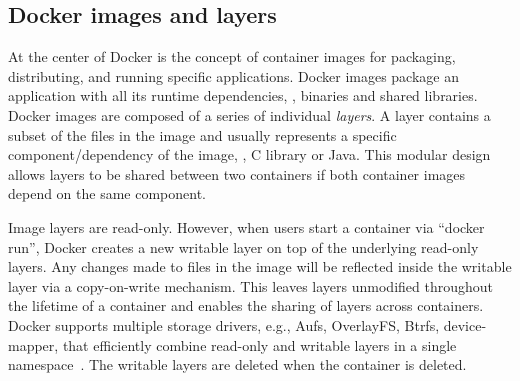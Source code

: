 
\subsection{Docker images and layers}
\label{sec-image-layers}

At the center of Docker is the concept of container images for packaging,
distributing, and running specific applications.
%
%
%
Docker images package an application with all its runtime dependencies, \eg,
binaries and shared libraries.
Docker images are composed of a series of individual \emph{layers}.
A layer contains a subset of the files in the image and 
usually represents a specific component/dependency of the image, \eg, C library or
Java. This modular design allows layers to be shared between two containers if both
container images depend on the same component. 


Image layers are read-only. However, when users start a
container via ``docker run'', Docker creates a new writable layer on top of the
underlying read-only layers. Any changes made to files in the image will be
reflected inside the writable layer via a copy-on-write mechanism. This leaves layers
unmodified throughout the lifetime of a container and enables the sharing of
layers across containers.
Docker supports multiple storage drivers, e.g., Aufs, OverlayFS, Btrfs,
device-mapper, that efficiently combine read-only and writable layers
in a single namespace~\cite{docker-driver-eval}.
The writable layers are deleted when the container is deleted.
 


